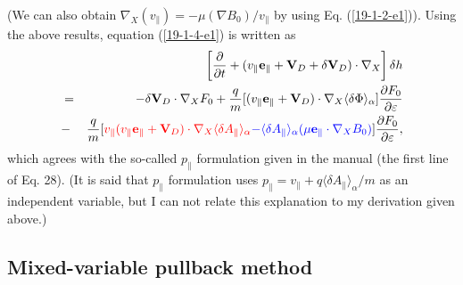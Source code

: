 \documentclass{article}
\newcommand{\tmcolor}[2]{{\color{#1}{#2}}}
\newcommand{\tmtexttt}[1]{\text{{\ttfamily{#1}}}}
\begin{document}
(We can also obtain $\nabla_X (v_{\parallel}) = - \mu (\nabla B_0) /
v_{\parallel}$ by using Eq. (\ref{19-1-2-e1})). Using the above results,
equation (\ref{19-1-4-e1}) is written as
\begin{eqnarray}
  &  & \left[ \frac{\partial}{\partial t} + (v_{\parallel}
  \mathbf{e}_{\parallel} +\mathbf{V}_D + \delta \mathbf{V}_D) \cdot \nabla_X
  \right] \delta h \nonumber\\
  & = & - \delta \mathbf{V}_D \cdot \nabla_X F_0 + \frac{q}{m}
  [(v_{\parallel} \mathbf{e}_{\parallel} +\mathbf{V}_D) \cdot \nabla_X \langle
  \delta \Phi \rangle_{\alpha}] \frac{\partial F_0}{\partial \varepsilon}
  \nonumber\\
  & - & \frac{q}{m} [\tmcolor{red}{v_{\parallel} (v_{\parallel}
  \mathbf{e}_{\parallel} +\mathbf{V}_D) \cdot \nabla_X \langle \delta
  A_{\parallel} \rangle_{\alpha}} \tmcolor{blue}{} \tmcolor{blue}{- \langle
  \delta A_{\parallel} \rangle_{\alpha} (\mu \mathbf{e}_{\parallel} \cdot
  \nabla_X B_0)}] \frac{\partial F_0}{\partial \varepsilon},  \label{19-1-4-5}
\end{eqnarray}
which agrees with the so-called $p_{\parallel}$ formulation given in the
\tmtexttt{GEM} manual (the first line of Eq. 28). (It is said that
$p_{\parallel}$ formulation uses $p_{\parallel} = v_{\parallel} + q \langle
\delta A_{\parallel} \rangle_{\alpha} / m$ as an independent variable, but I
can not relate this explanation to my derivation given above.)

\subsection{Mixed-variable pullback method{\cite{MISHCHENKO2019194}}}
\end{document}
